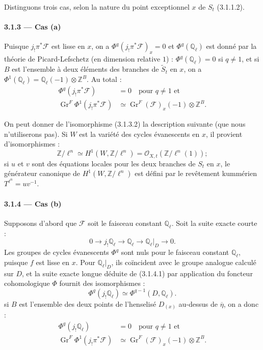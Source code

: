 \documentclass[12pt,a4paper]{article}
\theoremstyle{plain}
\theoremstyle{definition}
\theoremstyle{remark}
\DeclareMathOperator{\Gr}{Gr}
\newcommand{\QQ}{{\mathbb{Q}}}
\newcommand{\ZZ}{{\mathbb{Z}}}
\begin{document}
Distinguons trois cas, selon la nature du point exceptionnel $x$ de $S_t$ (3.1.1.2).

\paragraph{3.1.3 --- Cas (a)}
Puisque $j_! \pi^*\mathscr{F}$ est lisse en $x$, on a $\Phi^q(j_! \pi^*\mathscr{F})_x = 0$ et $\Phi^q(\QQ_\ell)$ est donn\'e par la th\'eorie de Picard-Lefschetz (en dimension relative $1$) : $\Phi^q(\QQ_\ell) = 0$ si $q \neq 1$, et si $B$ est l'ensemble \`a deux \'el\'ements des branches de $\widetilde{S}_t$ en $x$, on a $\Phi^1(\QQ_\ell) = \QQ_\ell(-1) \otimes \ZZ^B$. Au total :
\begin{align}
\Phi^q(j_! \pi^*\mathscr{F}) &= 0 \quad \text{pour } q \neq 1 \text{ et} \label{eq:3.1.3.1} \\
\Gr^F \Phi^1(j_! \pi^*\mathscr{F}) &\simeq \Gr^F(\mathscr{F})_x(-1) \otimes \ZZ^B. \label{eq:3.1.3.2}
\end{align}

On peut donner de l'isomorphisme (3.1.3.2) la description suivante (que nous n'utiliserons pas). Si $W$ est la vari\'et\'e des cycles \'evanescents en $x$, il provient d'isomorphismes :
\begin{equation}\label{eq:3.1.3.3}
\ZZ/\ell^n \simeq H^1(W, \ZZ/\ell^n) = \mathcal{O}_{X,t}(\ZZ/\ell^n(1));
\end{equation}
si $u$ et $v$ sont des \'equations locales pour les deux branches de $S_t$ en $x$, le g\'en\'erateur canonique de $H^1(W, \ZZ/\ell^n)$ est d\'efini par le rev\^etement kumm\'erien $T^{\ell^n} = uv^{-1}$.


\paragraph{3.1.4 --- Cas (b)}
Supposons d'abord que $\mathscr{F}$ soit le faisceau constant $\QQ_\ell$. Soit la suite exacte courte :
\begin{equation}\label{eq:3.1.4.1}
0 \to j_! \QQ_\ell \to \QQ_\ell \to \QQ_\ell|_D \to 0.
\end{equation}
Les groupes de cycles \'evanescents $\Phi^q$ sont nuls pour le faisceau constant $\QQ_\ell$, puisque $f$ est lisse en $x$. Pour $\QQ_\ell|_D$, ils co\"incident avec le groupe analogue calcul\'e sur $D$, et la suite exacte longue d\'eduite de (3.1.4.1) par application du foncteur cohomologique $\Phi$ fournit des isomorphismes :
\begin{equation}\label{eq:3.1.4.2}
\Phi^q(j_! \QQ_\ell) \simeq \Phi^{q-1}(D, \QQ_\ell).
\end{equation}
si $B$ est l'ensemble des deux points de l'henselis\'e $D_{(x)}$ au-dessus de $\overline{\eta}$, on a donc :
\begin{align}
\Phi^q(j_! \QQ_\ell) &= 0 \quad \text{pour } q \neq 1 \text{ et} \label{eq:3.1.4.3} \\
\Gr^F \Phi^1(j_! \pi^*\mathscr{F}) &\simeq \Gr^F(\mathscr{F})_x(-1) \otimes \ZZ^B. \label{eq:3.1.4.4}
\end{align}
\end{document}
